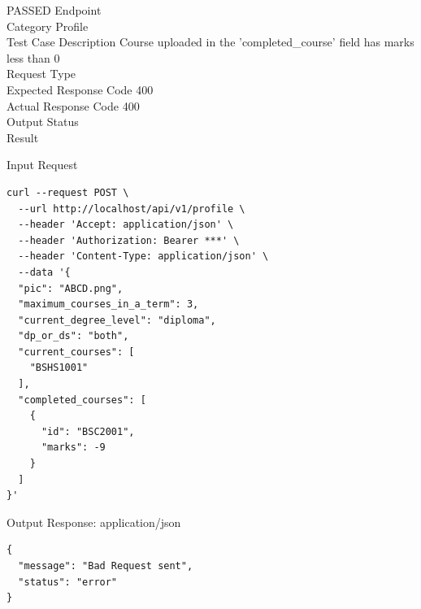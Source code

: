 \begin{testcase}{15}{PASSED}
Endpoint \hfill {}\\
Category \hfill Profile\\
Test Case Description \hfill Course uploaded in the 'completed\_course' field has marks less than 0\\

Request Type    \hfill {}\\
Expected Response Code    \hfill 400\\
Actual Response Code    \hfill 400\\

Output Status \hfill {}\\
Result \hfill {}

\begin{ipblock}{Input Request}
\begin{verbatim}
curl --request POST \
  --url http://localhost/api/v1/profile \
  --header 'Accept: application/json' \
  --header 'Authorization: Bearer ***' \
  --header 'Content-Type: application/json' \
  --data '{
  "pic": "ABCD.png",
  "maximum_courses_in_a_term": 3,
  "current_degree_level": "diploma",
  "dp_or_ds": "both",
  "current_courses": [
    "BSHS1001"
  ],
  "completed_courses": [
    {
      "id": "BSC2001",
      "marks": -9
    }
  ]
}'
\end{verbatim}
\end{ipblock}

\begin{opblock}{Output Response: application/json}
\begin{verbatim}
{
  "message": "Bad Request sent",
  "status": "error"
}
\end{verbatim}
\end{opblock}
\end{testcase}

